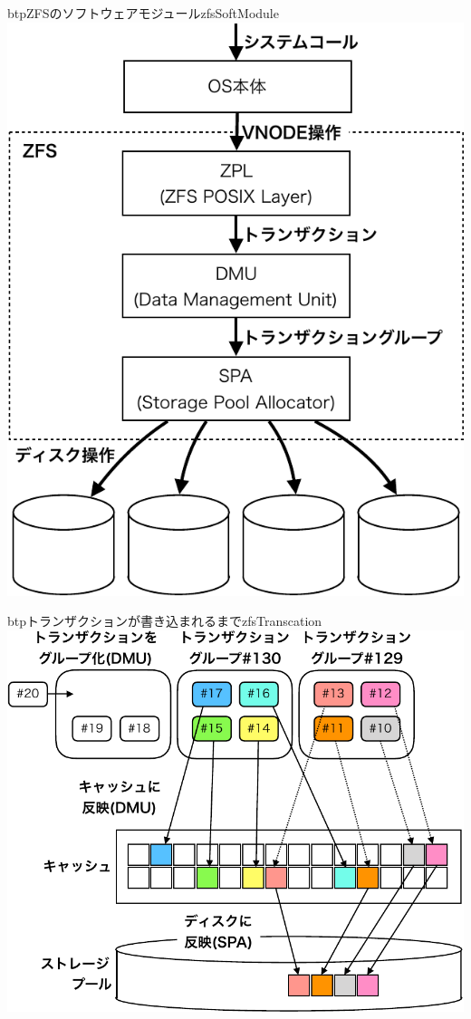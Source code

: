 \begin{myfig}{btp}{ZFSのソフトウェアモジュール}{zfsSoftModule}
  \centering\includegraphics[scale=0.65]{Fig/zfsSoftModule-crop.pdf}
\end{myfig}
  
\begin{myfig}{btp}{トランザクションが書き込まれるまで}{zfsTranscation}
  \centering\includegraphics[scale=0.65]{Fig/zfsTranscation-crop.pdf}
\end{myfig}
  
